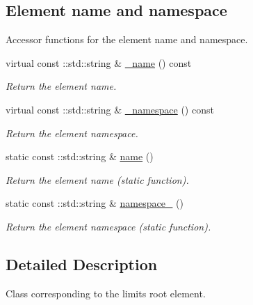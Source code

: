 \subsection*{Element name and namespace}
\label{_amgrpd4b5b61f6e07390f4af2465e04571f34}
Accessor functions for the element name and namespace. \begin{DoxyCompactItemize}
\item 
virtual const ::std::string \& \hyperlink{classopenstack_1_1xml_1_1Limits___aa2c051961e1536d032fec9e89a42b72b}{\_\-name} () const 
\begin{DoxyCompactList}\small\item\em Return the element name. \item\end{DoxyCompactList}\item 
virtual const ::std::string \& \hyperlink{classopenstack_1_1xml_1_1Limits___a0aa0cd971bae70517ce8b695f1c13964}{\_\-namespace} () const 
\begin{DoxyCompactList}\small\item\em Return the element namespace. \item\end{DoxyCompactList}\item 
static const ::std::string \& \hyperlink{classopenstack_1_1xml_1_1Limits___abad41bb3a62025c7238cbfed2bae0c07}{name} ()
\begin{DoxyCompactList}\small\item\em Return the element name (static function). \item\end{DoxyCompactList}\item 
static const ::std::string \& \hyperlink{classopenstack_1_1xml_1_1Limits___ac7ce80d5898601f8c5bc5ca94703d171}{namespace\_\-} ()
\begin{DoxyCompactList}\small\item\em Return the element namespace (static function). \item\end{DoxyCompactList}\end{DoxyCompactItemize}


\subsection{Detailed Description}
Class corresponding to the limits root element. 

